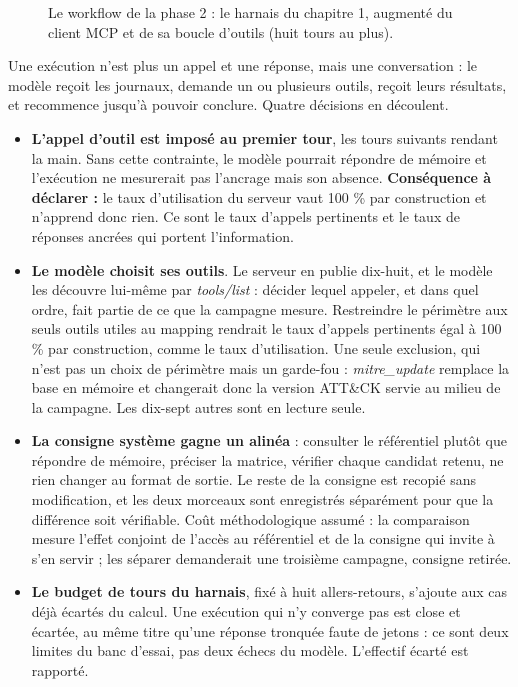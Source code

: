 \begin{figure}[htbp]
\centering
{}
\caption{Le workflow de la phase 2 : le harnais du chapitre 1, augmenté du client MCP et de sa boucle d'outils (huit tours au plus).}\label{fig:workflow-mcp}
\end{figure}

Une exécution n'est plus un appel et une réponse, mais une conversation : le modèle reçoit les journaux, demande un ou plusieurs outils, reçoit leurs résultats, et recommence jusqu'à pouvoir conclure. Quatre décisions en découlent.

\begin{itemize}
\tightlist
\item
  \textbf{L'appel d'outil est imposé au premier tour}, les tours suivants rendant la main. Sans cette contrainte, le modèle pourrait répondre de mémoire et l'exécution ne mesurerait pas l'ancrage mais son absence. \textbf{Conséquence à déclarer :} le taux d'utilisation du serveur vaut 100 \% par construction et n'apprend donc rien. Ce sont le taux d'appels pertinents et le taux de réponses ancrées qui portent l'information.
\item
  \textbf{Le modèle choisit ses outils}. Le serveur en publie dix-huit, et le modèle les découvre lui-même par \emph{tools/list} : décider lequel appeler, et dans quel ordre, fait partie de ce que la campagne mesure. Restreindre le périmètre aux seuls outils utiles au mapping rendrait le taux d'appels pertinents égal à 100 \% par construction, comme le taux d'utilisation. Une seule exclusion, qui n'est pas un choix de périmètre mais un garde-fou : \emph{mitre\_update} remplace la base en mémoire et changerait donc la version ATT\&CK servie au milieu de la campagne. Les dix-sept autres sont en lecture seule.
\item
  \textbf{La consigne système gagne un alinéa} : consulter le référentiel plutôt que répondre de mémoire, préciser la matrice, vérifier chaque candidat retenu, ne rien changer au format de sortie. Le reste de la consigne est recopié sans modification, et les deux morceaux sont enregistrés séparément pour que la différence soit vérifiable. Coût méthodologique assumé : la comparaison mesure l'effet conjoint de l'accès au référentiel et de la consigne qui invite à s'en servir ; les séparer demanderait une troisième campagne, consigne retirée.
\item
  \textbf{Le budget de tours du harnais}, fixé à huit allers-retours, s'ajoute aux cas déjà écartés du calcul. Une exécution qui n'y converge pas est close et écartée, au même titre qu'une réponse tronquée faute de jetons : ce sont deux limites du banc d'essai, pas deux échecs du modèle. L'effectif écarté est rapporté.
\end{itemize}

